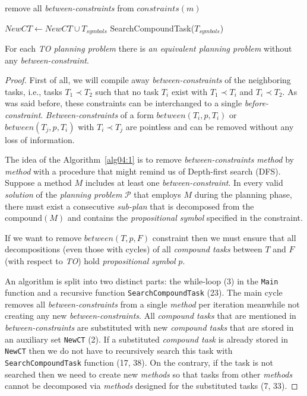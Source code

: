 \begin{algorithm}
\begin{algorithmic}[1]
                \State remove all \emph{between-constraints} from $constraints(m)$

                    \State $NewCT \gets NewCT \cup T_{symbols}$
                    \State SearchCompoundTask($T_{symbols}$)
                \EndFor
            \EndFor
        \EndProcedure
    \end{algorithmic}
\end{algorithm}

\begin{thm}\label{thm04:9}
    For each \emph{TO planning problem} there is \emph{an equivalent planning problem} without any \emph{between-constraint}.
\end{thm}
\begin{proof}
    First of all, we will compile away \emph{between-constraints} of the neighboring tasks, i.e., tasks $T_1 \prec T_2$ such that no task $T_i$ exist with $T_1 \prec T_i$ and $T_i \prec T_2$. As was said before, these constraints can be interchanged to a single \emph{before-constraint}. \emph{Between-constraints} of a form $between(T_i, p, T_i)$ or $between(T_j, p, T_i)$ with $T_i \prec T_j$ are pointless and can be removed without any loss of information.
    
    The idea of the Algorithm~\ref{alg04:1} is to remove \emph{between-constraints} \emph{method} by \emph{method} with a procedure that might remind us of Depth-first search (DFS). Suppose a method \( M \) includes at least one \emph{between-constraint}. In every valid \emph{solution} of the \emph{planning problem} \(\mathcal{P}\) that employs \( M \) during the planning phase, there must exist a consecutive \emph{sub-plan} that is decomposed from the \( \text{compound}(M) \) and contains the \emph{propositional symbol} specified in the constraint.

    If we want to remove $between(T, p, F)$ constraint then we must ensure that all decompositions (even those with cycles) of all \emph{compound tasks} between $T$ and $F$ (with respect to \emph{TO}) hold \emph{propositional symbol} $p$.
    
    An algorithm is split into two distinct parts: the while-loop (3) in the \texttt{Main} function and a recursive function \texttt{SearchCompoundTask} (23). The main cycle removes all \emph{between-constraints} from a single \emph{method} per iteration meanwhile not creating any new \emph{between-constraints}. All \emph{compound tasks} that are mentioned in \emph{between-constraints} are substituted with new \emph{compound tasks} that are stored in an auxiliary set \texttt{NewCT} (2). If a substituted \emph{compound task} is already stored in \texttt{NewCT} then we do not have to recursively search this task with \texttt{SearchCompoundTask} function (17, 38). On the contrary, if the task is not searched then we need to create new \emph{methods} so that tasks from other \emph{methods} cannot be decomposed via \emph{methods} designed for the substituted tasks (7, 33).


\end{proof}
